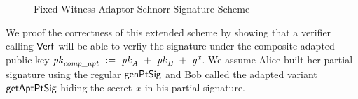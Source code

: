 \begin{figure}
    \label{fig:apt-schnorr}
    \fbox{
        \parbox{\textwidth} {
            \procedure[linenumbering, syntaxhighlight=auto]{$\procSetupApt{\varSecParam}$} {
                \varWit \sample \cnstIntegersPrimeWithoutZero{\varPrime} \\
                \pcreturn (\varWit, \varGWit)
            }
            \procedure[linenumbering, syntaxhighlight=auto]{$\procGenPtAptSig{\varMsg}{\varSecKeyAlice}{\varNonceAlice}{\varPubKeyBob}{\varRandBob}{\varWit}$}{
                \varSchnorrChallenge \opAssign \funHash{\varMsg \opConc \varRandAlice \opAdd \varRandBob \opConc \varPubKeyAlice \opAdd \varPubKeyBob} \\
                \varS \opAssign \varNonceAlice \opAdd \varSchnorrChallenge \opMult (\varSecKeyAlice \opAdd \varWit) \\
                \pcreturn \varSigAptAlice \opAssign (\varS)
            } \\[2\baselineskip]
            \procedure[linenumbering, syntaxhighlight=auto]{$\procVrfApt{\varMsg}{\varSecKeyAlice}{\varNonceAlice}{\varPubKeyBob}{\varRandBob}{\funGen{\varWit}}{\varSigAptBob}$} {
                \varSchnorrChallenge \opAssign \funHash{\varMsg \opConc \varPubKeyAlice \opAdd \varPubKeyBob \opConc \varRandAlice \opAdd \varRandBob} \\
                \pcreturn \varSigAptBob \opEq \varPubKeyBob \opAdd \varSchnorrChallenge \opMult \funGen{\varRandBob} \opAdd \funGen{\varWit}
            }
            \procedure[linenumbering, syntaxhighlight=auto]{$\procExtWit{\varSigFin}{\varSigAlice}{\varSigAptBob}$}{
                \varSigBob \opAssign \varSigFin \opSub \varSigAlice \\
                \varWit \opAssign \varSigAptBob \opSub \varSigBob \\
                \pcreturn (\varWit)
            }
        }
    }
    \caption{Fixed Witness Adaptor Schnorr Signature Scheme}
\end{figure}

We proof the correctness of this extended scheme by showing that a verifier calling $\mathsf{Verf}$ will be able to verfiy the signature under the composite adapted public key
$\mathit{pk}_{\mathit{comp\_apt}} ~:=~ \mathit{pk}_{\mathit{A}} ~+~ \mathit{pk}_{\mathit{B}} ~+~ \mathit{g}^{\mathit{x}}$. We assume Alice built her partial signature using the regular $\mathsf{genPtSig}$ and
Bob called the adapted variant $\mathsf{getAptPtSig}$ hiding the secret $\mathit{x}$ in his partial signature.

